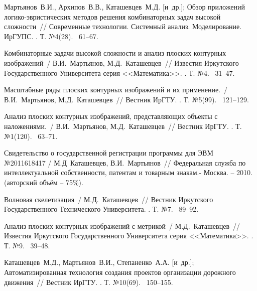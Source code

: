 \renewcommand{\refname}{Список основных работ по теме диссертации}
\begin{thebibliography}{10}

Мартьянов~В.И., Архипов~В.В., Каташевцев~М.Д.
  {[и~др.]}; Обзор приложений
  логико-эвристических методов решения
  комбинаторных задач высокой сложности~//
  Современные технологии. Системный анализ.
  Моделирование. ИрГУПС.
.
\newblock Т. №4(28).
~61--67.{}

Комбинаторные задачи высокой сложности и
  анализ плоских контурных изображений~/
  В.И.~Мартьянов, М.Д.~Каташевцев~// Известия
  Иркутского Государственного
  Университета серия <<Математика>>.
.
\newblock Т. №4.
~31--47.{}

Масштабные ряды плоских контурных
  изображений и их применение.~/
  В.И.~Мартьянов, М.Д.~Каташевцев~// Вестник
  ИрГТУ.
.
\newblock Т. №5(99).
~121--129.{}

Анализ плоских контурных изображений,
  представляющих объекты с наложениями.~/
  В.И.~Мартьянов, М.Д.~Каташевцев~// Вестник
  ИрГТУ.
.
\newblock Т. №1(120).
~63--71.{}

Свидетельство о
  государственной регистрации программы
  для ЭВМ №2011618417  / М.Д~Каташевцев, В.И.~Мартьянов~// Федеральная служба по
    интеллектуальной собственности, патентам
    и товарным знакам.- Москва. -- 2010. (авторский объём – 75\%).

Волновая скелетизация~/ М.Д.~Каташевцев~//
  Вестник Иркутского Государственного
  Технического Университета.
.
\newblock Т. №7.
~89--92.{}

Анализ плоских контурных изображений с
  метрикой~/ М.Д.~Каташевцев~// Известия
  Иркутского Государственного
  Университета серия <<Математика>>.
.
\newblock Т. №9.
~39--48.{}

Каташевцев~М.Д., Мартьянов~В.И.,
  Степаненко~А.А. {[и~др.]};
  Автоматизированная технология создания
  проектов организации дорожного
  движения~// Вестник ИрГТУ.
.
\newblock Т. №10(69).
~150--155.{}


\end{thebibliography}
